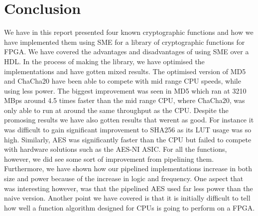 \documentclass[a4paper, openany]{book}
\begin{document}
\chapter{Conclusion}
\label{sec:org509d06b}
We have in this report presented four known cryptographic functions and how we have implemented them using SME
for a library of cryptographic functions for FPGA. We have covered the advantages and disadvantages of using SME over a HDL.
In the process of making the library, we have optimised the implementations and have gotten mixed results.
The optimised version of MD5 and ChaCha20 have been able to compete with mid range CPU speeds, while using less power.
The biggest improvement was seen in MD5 which ran at 3210 MBps around 4.5 times faster than the mid range CPU, where ChaCha20,
was only able to run at around the same throughput as the CPU. Despite the promosing results we have also gotten results that werent as good.
For instance it was difficult to gain significant improvement to SHA256 as its LUT usage was so high.
Similarly, AES was significantly faster than the CPU but failed to compete with hardware solutions such as the AES-NI ASIC.
For all the functions, however, we did see some sort of improvement from pipelining them.
Furthermore, we have shown how our pipelined implementations increase in both size and power because of the increase in logic and frequency.
One aspect that was interesting however, was that the pipelined AES used far less power than the naive version.
Another point we have covered is that it is initially difficult to tell how well a function algorithm designed for CPUs is going to perform on a FPGA.



\end{document}
